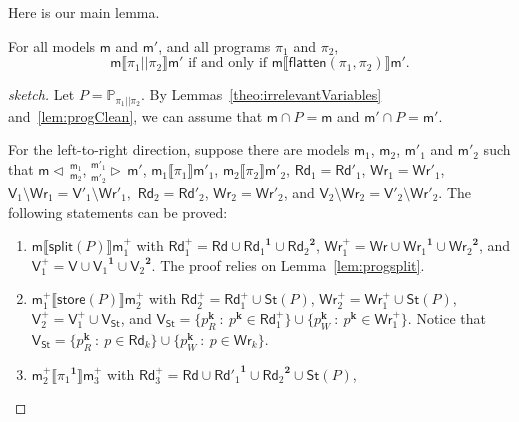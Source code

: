 \documentclass{llncs}
\newcommand{\progStore}{\mathsf{store}}
\newcommand{\progsplit}{\mathsf{split}}
\newcommand{\progFlatten}{\mathsf{flatten}}
\newcommand{\cp}[2]{{#2}^\mathbf{#1}}
\newcommand{\cpr}[2]{\cp{#1}{#2}_R}
\newcommand{\cpw}[2]{\cp{#1}{#2}_W}
\newcommand{\modl}{\mathsf m}
\newcommand{\mrg}[3]{ ^{#2}_{#3} \triangleright \, #1 }
\newcommand{\pll}{ {||} }							%
\newcommand{\splt}[3]{ #1 \triangleleft \, ^{#2}_{#3} }
\newcommand{\readset}{\mathsf{Rd}}
\newcommand{\valuset}{\mathsf{V}}
\newcommand{\writeset}{\mathsf{Wr}}
\newcommand{\storeset}{\mathsf{St}}
\newcommand{\intPgm}[1]{\llbracket #1 \rrbracket}
\newcommand{\propset}{\mathbb P}
\newcommand{\propsetOf}[1]{\propset_{#1}}
\newcommand{\modinter}{\cap}
\newcommand{\set}[1]{\{#1\}}
\newcommand{\suchthat}{~ : ~}
\begin{document}
Here is our main lemma.

\begin{lemma}\label{lem:pllequivalence}
For all models $\modl$ and $\modl'$, and all programs $\pi_1$ and $\pi_2$,
$$
\modl \intPgm{\pi_1 \pll \pi_2} \modl' \text{ if and only if }
\modl \intPgm{\progFlatten(\pi_1, \pi_2)} \modl' \text{.}
$$
\end{lemma}
\begin{proof}[sketch]
Let $P = \propsetOf{\pi_1 \pll \pi_2}$. By Lemmas~\ref{theo:irrelevantVariables} and~\ref{lem:progClean},
we can assume that $\modl \modinter P = \modl$ and $\modl' \modinter P = \modl'$.

For the left-to-right direction, suppose there are models $\modl_1$, $\modl_2$, $\modl'_1$ and $\modl'_2$ such that
$\splt{\modl}{\modl_1} {\modl_2} $, $\mrg{\modl'}{\modl'_1} {\modl'_2} $,
$\modl_1 \intPgm{ \pi_1 } \modl'_1$, 
$\modl_2 \intPgm{ \pi_2 } \modl'_2$, 
$\readset_1 = \readset'_1 $, $\writeset_1 = \writeset'_1 $, $\valuset_1 \setminus \writeset_1 = \valuset'_1 \setminus \writeset'_1 , $
$\readset_2 = \readset'_2 $, $\writeset_2 = \writeset'_2 $, and $\valuset_2 \setminus \writeset_2 = \valuset'_2 \setminus \writeset'_2 $.
The following statements can be proved:
\begin{enumerate}
  \item\label{pllequivalence:ltr:split}
        $\modl \intPgm{\progsplit(P)} \modl^+_1$ with
        $\readset^+_1 = \readset \cup \cp 1 {\readset_1} \cup \cp 2 {\readset_2}$,
        $\writeset^+_1 = \writeset \cup \cp 1 {\writeset_1} \cup \cp 2 {\writeset_2}$, and
        $\valuset^+_1 = \valuset \cup \cp 1 {\valuset_1} \cup \cp 2 {\valuset_2}$.
        The proof relies on Lemma~\ref{lem:progsplit}.
  \item\label{pllequivalence:ltr:store}
        $\modl^+_1 \intPgm{\progStore(P)} \modl^+_2$ with
        $\readset^+_2 = \readset^+_1 \cup \storeset(P)$,
        $\writeset^+_2 = \writeset^+_1 \cup \storeset(P)$,
        $\valuset^+_2 = \valuset^+_1 \cup \valuset_{\storeset}$, and
        $\valuset_{\storeset} =
        \set{ \cpr k p \suchthat \cp k p \in \readset^+_1} \cup
        \set{ \cpw k p \suchthat \cp k p \in \writeset^+_1}$.
        Notice that
        $\valuset_{\storeset} =
        \set{ \cpr k p \suchthat p \in \readset_k} \cup
        \set{ \cpw k p \suchthat p \in \writeset_k}$.
  \item\label{pllequivalence:ltr:pi1}
        $\modl^+_2 \intPgm{\cp 1 {\pi_1}} \modl^+_3$ with
        $\readset^+_3 = \readset \cup \cp 1 {\readset'_1} \cup \cp 2 {\readset_2} \cup \storeset(P)$,

\end{enumerate}
\end{proof}
\end{document}
